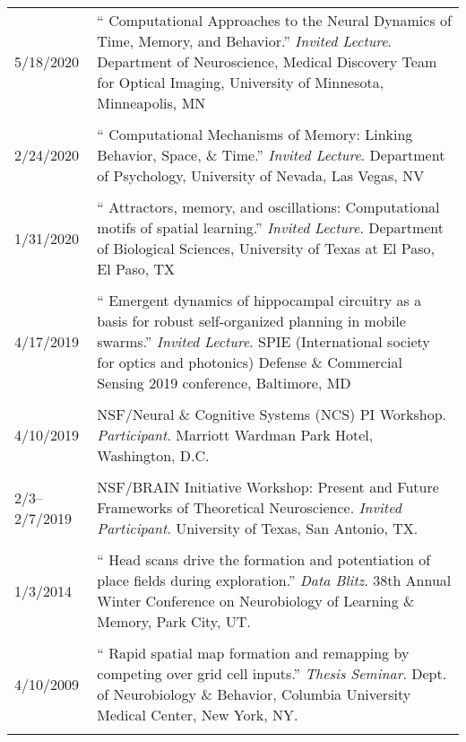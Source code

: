 \documentclass[10pt]{article}
\newcommand{\unpubtitle}[1]{{\color{hopkinsblue} #1}}
\begin{document}
\begin{longtable}{@{\hspace{0.2in}}l>{\raggedright\arraybackslash}p{}}
  5/18/2020 \hspace{0.3in} & ``\unpubtitle{Computational Approaches to the
  Neural Dynamics of Time, Memory, and Behavior}.'' \emph{Invited Lecture}.
  Department of Neuroscience, Medical Discovery Team for Optical Imaging,
  University of Minnesota, Minneapolis, MN\\
  \tabularnewline
  2/24/2020 \hspace{0.3in} & ``\unpubtitle{Computational Mechanisms of Memory:
  Linking Behavior, Space, \& Time}.'' \emph{Invited Lecture}. Department of
  Psychology, University of Nevada, Las Vegas, NV\\
  \tabularnewline
  1/31/2020 \hspace{0.3in} & ``\unpubtitle{Attractors, memory, and oscillations:
  Computational motifs of spatial learning}.'' \emph{Invited Lecture}.
  Department of Biological Sciences, University of Texas at El Paso, El Paso, TX\\
  \tabularnewline
  4/17/2019 \hspace{0.3in} & ``\unpubtitle{Emergent dynamics of hippocampal
  circuitry as a basis for robust self-organized planning in mobile swarms}.''
  \emph{Invited Lecture}. SPIE (International society for optics and photonics)
  Defense \& Commercial Sensing 2019 conference, Baltimore, MD\\
  \tabularnewline
  4/10/2019 & NSF/Neural \& Cognitive Systems (NCS) PI
  Workshop. \emph{Participant}. Marriott Wardman Park Hotel, Washington, D.C.\\
  \tabularnewline
  2/3--2/7/2019 & NSF/BRAIN Initiative Workshop: Present and Future Frameworks
  of Theoretical Neuroscience. \emph{Invited Participant}. University of Texas,
  San Antonio, TX.\\
  \tabularnewline
  1/3/2014 & ``\unpubtitle{Head scans drive the formation and potentiation
  of place fields during exploration}.'' \emph{Data Blitz}. 38th Annual Winter
  Conference on Neurobiology of Learning \& Memory, Park City, UT.\\
  \tabularnewline
  4/10/2009 & ``\unpubtitle{Rapid spatial map formation and remapping by
  competing over grid cell inputs}.'' \emph{Thesis Seminar}. Dept. of Neurobiology
  \& Behavior, Columbia University Medical Center, New York, NY.\\
  \tabularnewline
\end{longtable}
\end{document}
